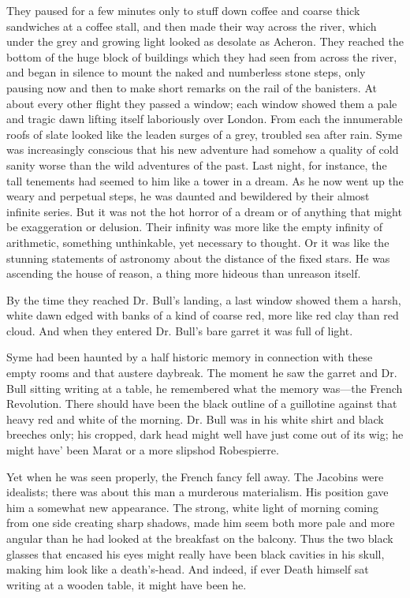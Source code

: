 \documentclass{book}
\begin{document}
They paused for a few minutes only to stuff down coffee and coarse thick sandwiches at a coffee stall, and then made their way across the river, which under the grey and growing light looked as desolate as Acheron. They reached the bottom of the huge block of buildings which they had seen from across the river, and began in silence to mount the naked and numberless stone steps, only pausing now and then to make short remarks on the rail of the banisters. At about every other flight they passed a window; each window showed them a pale and tragic dawn lifting itself laboriously over London. From each the innumerable roofs of slate looked like the leaden surges of a grey, troubled sea after rain. Syme was increasingly conscious that his new adventure had somehow a quality of cold sanity worse than the wild adventures of the past. Last night, for instance, the tall tenements had seemed to him like a tower in a dream. As he now went up the weary and perpetual steps, he was daunted and bewildered by their almost infinite series. But it was not the hot horror of a dream or of anything that might be exaggeration or delusion. Their infinity was more like the empty infinity of arithmetic, something unthinkable, yet necessary to thought. Or it was like the stunning statements of astronomy about the distance of the fixed stars. He was ascending the house of reason, a thing more hideous than unreason itself.

By the time they reached Dr. Bull’s landing, a last window showed them a harsh, white dawn edged with banks of a kind of coarse red, more like red clay than red cloud. And when they entered Dr. Bull’s bare garret it was full of light.

Syme had been haunted by a half historic memory in connection with these empty rooms and that austere daybreak. The moment he saw the garret and Dr. Bull sitting writing at a table, he remembered what the memory was—the French Revolution. There should have been the black outline of a guillotine against that heavy red and white of the morning. Dr. Bull was in his white shirt and black breeches only; his cropped, dark head might well have just come out of its wig; he might have’ been Marat or a more slipshod Robespierre.

Yet when he was seen properly, the French fancy fell away. The Jacobins were idealists; there was about this man a murderous materialism. His position gave him a somewhat new appearance. The strong, white light of morning coming from one side creating sharp shadows, made him seem both more pale and more angular than he had looked at the breakfast on the balcony. Thus the two black glasses that encased his eyes might really have been black cavities in his skull, making him look like a death’s-head. And indeed, if ever Death himself sat writing at a wooden table, it might have been he.
\end{document}
